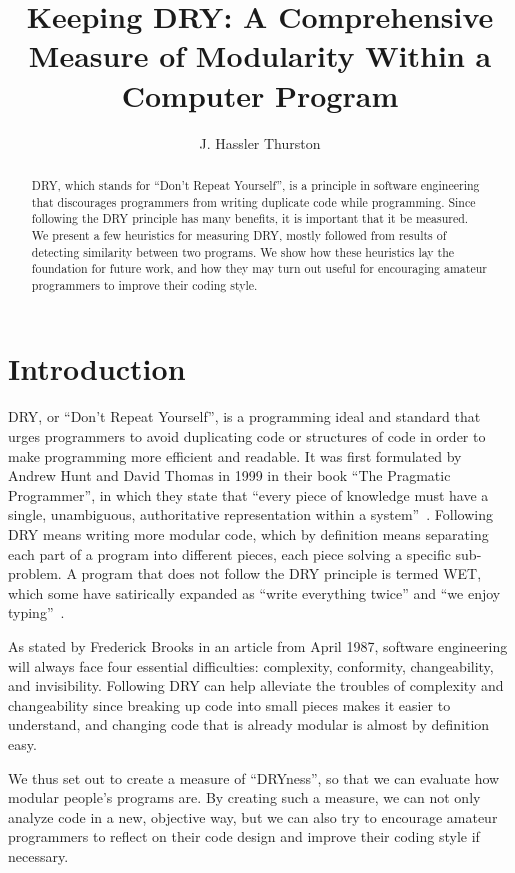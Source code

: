 \documentclass{article}
\title{Keeping DRY: A Comprehensive Measure of Modularity Within a Computer Program}
\author{J. Hassler Thurston}
\date{}
\begin{document}
\maketitle

\begin{abstract}

DRY, which stands for ``Don't Repeat Yourself'', is a principle in software engineering that discourages programmers from
writing duplicate code while programming. Since following the DRY principle has many benefits, it is important that it 
be measured. We present a few heuristics for measuring DRY, mostly followed from results of detecting
similarity between two programs. We show how these heuristics lay the foundation for future work, and how they
 may turn out useful for encouraging amateur programmers to improve their coding style.

\end{abstract}

\section{Introduction} DRY, or ``Don't Repeat Yourself'', is a programming ideal and standard that urges programmers to avoid 
duplicating code or structures of code in order to make programming more efficient and readable. It was first formulated by Andrew Hunt
 and David Thomas in 1999 in their book ``The Pragmatic Programmer'', in which they state that ``every piece of knowledge must have a 
 single, unambiguous, authoritative representation within a system''~\cite{PragmaticProgrammer}. Following DRY means writing more modular
code, which by definition means separating each part of a program into different pieces, each piece solving a specific sub-problem.
A program that does not follow the DRY principle is termed WET, which some have satirically expanded as ``write everything twice''
 and ``we enjoy typing''~\cite{WETness}.

As stated by Frederick Brooks in an article
from April 1987\cite{NoSilverBullet}, software engineering will always face four essential difficulties: complexity, conformity, 
changeability, and invisibility. Following DRY can help alleviate the troubles of complexity and changeability since breaking up code
into small pieces makes it easier to understand, and changing code that is already modular is almost by definition easy.

We thus set out to create a measure of ``DRYness'', so that we can evaluate how modular people's programs are.
By creating such a measure, we can not only analyze code in a new, objective way, but we can also try to encourage amateur programmers
to reflect on their code design and improve their coding style if necessary.
\end{document}

